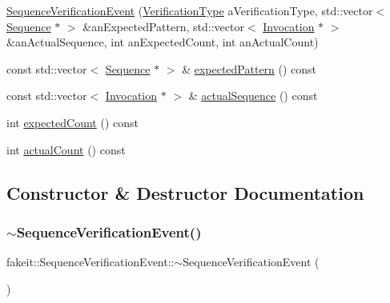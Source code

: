 \begin{DoxyCompactItemize}
\item 
\mbox{\hyperlink{structfakeit_1_1SequenceVerificationEvent_ab0842bb20a84757c265ecdee00f41c91}{Sequence\+Verification\+Event}} (\mbox{\hyperlink{namespacefakeit_a9df22520dd60badb149c1d1d2518b253}{Verification\+Type}} a\+Verification\+Type, std\+::vector$<$ \mbox{\hyperlink{classfakeit_1_1Sequence}{Sequence}} $\ast$ $>$ \&an\+Expected\+Pattern, std\+::vector$<$ \mbox{\hyperlink{structfakeit_1_1Invocation}{Invocation}} $\ast$ $>$ \&an\+Actual\+Sequence, int an\+Expected\+Count, int an\+Actual\+Count)
\item 
const std\+::vector$<$ \mbox{\hyperlink{classfakeit_1_1Sequence}{Sequence}} $\ast$ $>$ \& \mbox{\hyperlink{structfakeit_1_1SequenceVerificationEvent_a2d3fb35082acdadfe2be2a4d69c94189}{expected\+Pattern}} () const
\item 
const std\+::vector$<$ \mbox{\hyperlink{structfakeit_1_1Invocation}{Invocation}} $\ast$ $>$ \& \mbox{\hyperlink{structfakeit_1_1SequenceVerificationEvent_aecdc4dac839dc16a96ee85b0d0297bed}{actual\+Sequence}} () const
\item 
int \mbox{\hyperlink{structfakeit_1_1SequenceVerificationEvent_ad0970b6b1b3b3d122e0494e95c6a00eb}{expected\+Count}} () const
\item 
int \mbox{\hyperlink{structfakeit_1_1SequenceVerificationEvent_a4f7daa947cca317c30e74ee66540d3b9}{actual\+Count}} () const
\end{DoxyCompactItemize}


\subsection{Constructor \& Destructor Documentation}
\mbox{\label{structfakeit_1_1SequenceVerificationEvent_a8f8e45c2407802e200befa82790c5e13}} 
\subsubsection{\texorpdfstring{$\sim$SequenceVerificationEvent()}{~SequenceVerificationEvent()}\hspace{0.1cm}{\footnotesize\ttfamily [1/9]}}
{\footnotesize\ttfamily fakeit\+::\+Sequence\+Verification\+Event\+::$\sim$\+Sequence\+Verification\+Event (\begin{DoxyParamCaption}{ }\end{DoxyParamCaption})\hspace{0.3cm}{\ttfamily [default]}}

